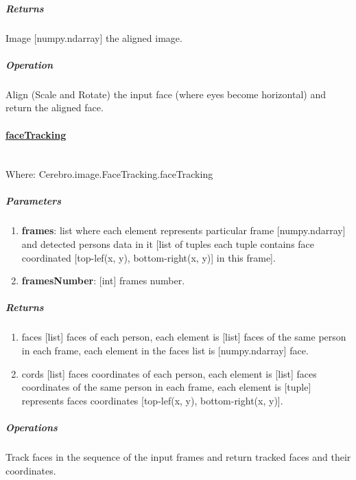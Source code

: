\subparagraph{Returns}
\begin{changemargin}{1cm}{0cm}
	Image [numpy.ndarray] the aligned image.
\end{changemargin}

\subparagraph{Operation}
\begin{changemargin}{1cm}{0cm}
	Align (Scale and Rotate) the input face (where eyes become horizontal) and return the aligned face.
\end{changemargin}
\hrulefill

\paragraph{\underline{faceTracking}} \mbox{} \\
Where: Cerebro.image.FaceTracking.faceTracking
\subparagraph{Parameters}
\begin{changemargin}{0.5cm}{0cm}
	\begin{enumerate}
		\item \textbf{frames}: list where each element represents particular frame [numpy.ndarray] and detected persons data in it [list of tuples each tuple contains face coordinated [top-lef(x, y), bottom-right(x, y)] in this frame].
		\item \textbf{framesNumber}: [int] frames number.
	\end{enumerate}
\end{changemargin}

\subparagraph{Returns}
\begin{changemargin}{1cm}{0cm}
	\begin{enumerate} 
		\item faces [list] faces of each person, each element is [list] faces of the same person in each frame, each element in the faces list is [numpy.ndarray] face.
		\item cords [list] faces coordinates of each person, each element is [list] faces coordinates of the same person in each frame, each element is [tuple] represents faces coordinates [top-lef(x, y), bottom-right(x, y)].
	\end{enumerate}
\end{changemargin}

\subparagraph{Operations}
\begin{changemargin}{1cm}{0cm}
	Track faces in the sequence of the input frames and return tracked faces and their coordinates.
\end{changemargin}